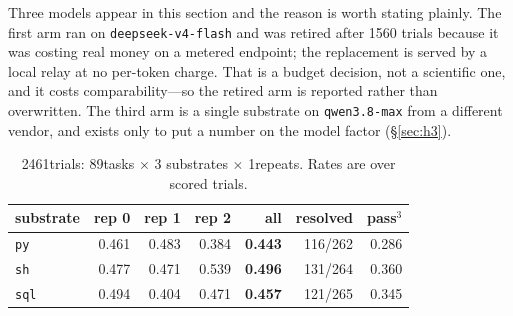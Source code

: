 \documentclass[11pt,a4paper]{article}
\begin{document}
Three models appear in this section and the reason is worth stating plainly.
The first arm ran on \texttt{deepseek-v4-flash} and was retired after 1560
trials because it was costing real money on a metered endpoint; the replacement
is served by a local relay at no per-token charge. That is a budget decision,
not a scientific one, and it costs comparability---so the retired arm is
reported rather than overwritten. The third arm is a single substrate on
\texttt{qwen3.8-max} from a different vendor, and exists only to put a number
on the model factor (\S\ref{sec:h3}).

\begin{table}[h]\centering\small
\caption{The arms. Protocols belong to the adapter, never to the kernel:
\texttt{a} forbids commentary, \texttt{b} requires a thought before the action,
\texttt{br} is \texttt{b} with an output budget wide enough for a model that
reasons before it answers.}
\label{tab:tbarms}
\end{table}

\begin{table}[h]\centering\small
\caption{2461trials: 89tasks $\times$ 3 substrates $\times$
1repeats. Rates are over scored trials.}
\label{tab:tb}
\begin{tabular}{lrrrrrr}
\toprule
substrate & rep 0 & rep 1 & rep 2 & all & resolved & pass$^3$ \\
\midrule
\texttt{py} & 0.461 & 0.483 & 0.384 & \textbf{0.443} & 116/262 & 0.286 \\
\texttt{sh} & 0.477 & 0.471 & 0.539 & \textbf{0.496} & 131/264 & 0.360 \\
\texttt{sql} & 0.494 & 0.404 & 0.471 & \textbf{0.457} & 121/265 & 0.345 \\
\bottomrule
\end{tabular}
\end{table}
\end{document}
